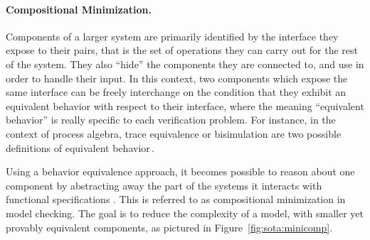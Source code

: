 \paragraph{Compositional Minimization.}
%
Components of a larger system are primarily identified by the interface they
expose to their pairs, that is the set of operations they can carry out for the
rest of the system.
%
They  also
``hide'' the components they are connected to, and use in order to handle their
input.
%
In this context, two components which expose the same interface can be freely
interchange on the condition that they exhibit an equivalent behavior with
respect to their interface, where the meaning ``equivalent behavior'' is really
specific to each verification problem.
%
For instance, in the context of process algebra, trace equivalence or
bisimulation are two possible definitions of equivalent
behavior\,\cite{fokkink2013pa}.

Using a behavior equivalence approach, it becomes possible to reason about one
component by abstracting away the part of the systems it interacts with
functional specifications .
%
This is referred to as compositional minimization in model checking.
%
The goal is to reduce the complexity of a model, with smaller  yet provably equivalent components, as pictured in
Figure~\ref{fig:sota:minicomp}. 
%


